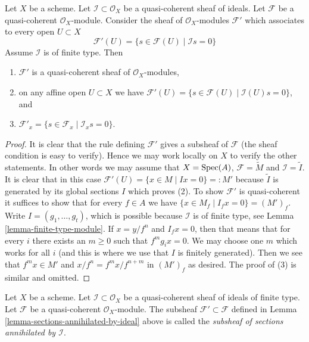 \begin{lemma}
\label{lemma-sections-annihilated-by-ideal}
Let $X$ be a scheme.
Let $\mathcal{I} \subset \mathcal{O}_X$ be a quasi-coherent sheaf of ideals.
Let $\mathcal{F}$ be a quasi-coherent $\mathcal{O}_X$-module.
Consider the sheaf of $\mathcal{O}_X$-modules $\mathcal{F}'$
which associates to every open $U \subset X$
$$
\mathcal{F}'(U)
=
\{s \in \mathcal{F}(U) \mid
\mathcal{I}s = 0\}
$$
Assume $\mathcal{I}$ is of finite type. Then
\begin{enumerate}
\item $\mathcal{F}'$ is a quasi-coherent sheaf of $\mathcal{O}_X$-modules,
\item on any affine open $U \subset X$ we have
$\mathcal{F}'(U) = \{s \in \mathcal{F}(U) \mid \mathcal{I}(U)s = 0\}$, and
\item $\mathcal{F}'_x = \{s \in \mathcal{F}_x \mid \mathcal{I}_x s = 0\}$.
\end{enumerate}
\end{lemma}

\begin{proof}
It is clear that the rule defining $\mathcal{F}'$ gives a subsheaf
of $\mathcal{F}$ (the sheaf condition is easy to verify). Hence we
may work locally on $X$ to verify the other statements. In other words
we may assume that $X = \mathop{\mathrm{Spec}}(A)$, $\mathcal{F} = \widetilde{M}$
and $\mathcal{I} = \widetilde{I}$. It is clear that in this case
$\mathcal{F}'(U) = \{x \in M \mid Ix = 0\} =: M'$ because $\widetilde{I}$
is generated by its global sections $I$ which proves (2).
To show $\mathcal{F}'$ is quasi-coherent it suffices to show that
for every $f \in A$ we have
$\{x \in M_f \mid I_f x = 0\} = (M')_f$.
Write $I = (g_1, \ldots, g_t)$, which is possible because $\mathcal{I}$
is of finite type, see Lemma \ref{lemma-finite-type-module}.
If $x = y/f^n$ and $I_fx = 0$, then that means that for every $i$
there exists an $m \geq 0$ such that $f^mg_ix = 0$.
We may choose one $m$ which works for all $i$ (and this is where we
use that $I$ is finitely generated). Then we see that $f^mx \in M'$
and $x/f^n = f^mx/f^{n + m}$ in $(M')_f$ as desired.
The proof of (3) is similar and omitted.
\end{proof}

\begin{definition}
\label{definition-subsheaf-sections-annihilated-by-ideal}
Let $X$ be a scheme.
Let $\mathcal{I} \subset \mathcal{O}_X$ be a quasi-coherent sheaf of ideals
of finite type.
Let $\mathcal{F}$ be a quasi-coherent $\mathcal{O}_X$-module.
The subsheaf $\mathcal{F}' \subset \mathcal{F}$ defined in
Lemma \ref{lemma-sections-annihilated-by-ideal} above is called
the {\it subsheaf of sections annihilated by $\mathcal{I}$}.
\end{definition}

